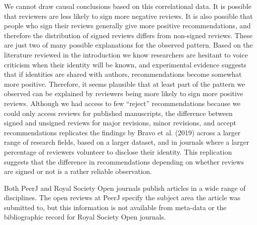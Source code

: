 \documentclass[
  english,
  ,jou, a4paper,floatsintext]{apa6}
\begin{document}
We cannot draw causal conclusions based on this correlational data. It is possible that reviewers are less likely to sign more negative reviews. It is also possible that people who sign their reviews generally give more positive recommendations, and therefore the distribution of signed reviews differs from non-signed reviews. These are just two of many possible explanations for the observed pattern. Based on the literature reviewed in the introduction we know researchers are hesitant to voice criticism when their identity will be known, and experimental evidence suggests that if identities are shared with authors, recommendations become somewhat more positive. Therefore, it seems plausible that at least part of the pattern we observed can be explained by reviewers being more likely to sign more positive reviews. Although we had access to few \enquote{reject} recommendations because we could only access reviews for published manuscripts, the difference between signed and unsigned reviews for major revisions, minor revisions, and accept recommendations replicates the findings by Bravo et al. (2019) across a larger range of research fields, based on a larger dataset, and in journals where a larger percentage of reviewers volunteer to disclose their identity. This replication suggests that the difference in recommendations depending on whether reviews are signed or not is a rather reliable observation.

Both PeerJ and Royal Society Open journals publish articles in a wide range of disciplines. The open reviews at PeerJ specify the subject area the article was submitted to, but this information is not available from meta-data or the bibliographic record for Royal Society Open journals.

\onecolumn
\end{document}
